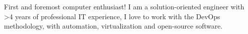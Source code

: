 \documentclass[9pt]{style/developercv}
\begin{document}
\vspace{0.5cm}



\begin{minipage}[t]{0.4\textwidth} %
	\vspace{-\baselineskip} %

  First and foremost computer enthusiast! I am a solution-oriented engineer with >4 years of professional IT experience,
  I love to work with the DevOps methodology, with automation, virtualization and open-source software.

\end{minipage}
\hfill %
\begin{minipage}[t]{0.5\textwidth} %
	\vspace{-\baselineskip} %
  \begin{barchart}{5.5}
	\end{barchart}
\end{minipage}

\vspace{1cm}

\end{document}
